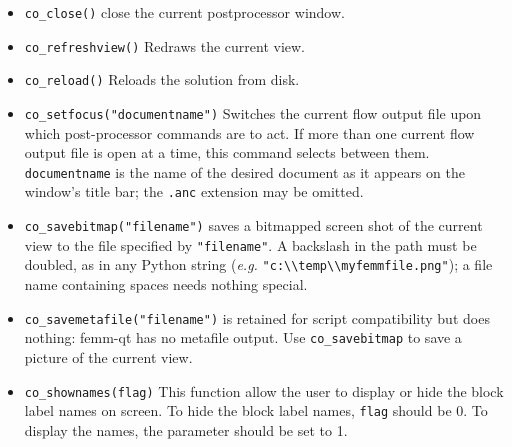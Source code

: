 \begin{itemize}

\item \texttt{co\_close()} close the current postprocessor window.

\item{\tt co\_refreshview()} Redraws the current view.

\item{\tt co\_reload()} Reloads the solution from disk.
\item{\tt co\_setfocus("documentname")} Switches the current flow output
file upon which post-processor commands are to act.  If more than one
current flow output file is open at a time, this command selects between them.
{\tt documentname} is the name of the desired document as it appears on the
window's title bar; the {\tt .anc} extension may be omitted.

\item \texttt{co\_savebitmap("filename")} saves a bitmapped screen shot of the current
view to the file specified by {\tt "filename"}.  A backslash in the path
must be doubled, as in any Python string ({\em e.g.}
\verb+"c:\\temp\\myfemmfile.png"+); a file name containing spaces needs
nothing special.
\item \texttt{co\_savemetafile("filename")} is retained for script
compatibility but does nothing: femm-qt has no metafile output. Use
\texttt{co\_savebitmap} to save a picture of the current view.

\item \texttt{co\_shownames(flag)} This function allow the user to display or hide the
block label names on screen. To hide the block label names,
\texttt{flag} should be 0. To display the names, the parameter
should be set to 1.



\end{itemize}
